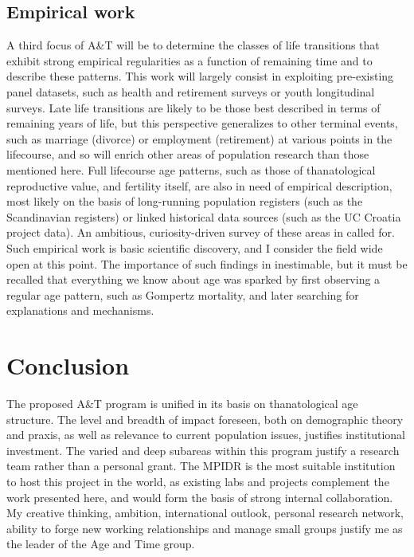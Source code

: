 \documentclass[a4paper,12pt]{article}
\begin{document}
\subsection{Empirical work}
A third focus of A\&T will be to determine the classes of
life transitions that exhibit strong empirical regularities as a function
of remaining time and to describe these patterns. This work will largely consist
in exploiting pre-existing panel datasets, such as health and retirement
surveys or youth longitudinal surveys.
Late life transitions are likely to be those best described in terms of remaining years of life, but this
perspective generalizes to other terminal events, such as marriage (divorce) or
employment (retirement) at various points in the lifecourse, and so will enrich
other areas of population research than those mentioned here. Full lifecourse age patterns, such as
those of thanatological reproductive value, and fertility itself, are also in
need of empirical description, most likely on the basis of long-running
population registers (such as the Scandinavian registers) or linked historical
data sources (such as the UC Croatia project data).
An ambitious, curiosity-driven survey of these areas in called for.
Such empirical work is basic scientific discovery, and I consider the field wide open at this point. The importance of such
findings in inestimable, but it must be recalled that everything we know about age was sparked by first observing a regular age pattern, such as Gompertz mortality, and later
searching for explanations and mechanisms.

\section{Conclusion}
The proposed A\&T program is unified in its basis on thanatological age
structure. The level and breadth of impact foreseen, both on demographic
theory and praxis, as well as relevance to current population issues, justifies
institutional investment. The varied and deep subareas within this program
justify a research team rather than a personal grant. The MPIDR is the most suitable
institution to host this project in the world, as existing labs and projects
complement the work presented here, and would form the basis of strong internal collaboration.
My creative thinking, ambition, international outlook, personal research
network, ability to forge new working relationships and manage small groups
justify me as the leader of the Age and Time group. 


\pagebreak
\end{document}

